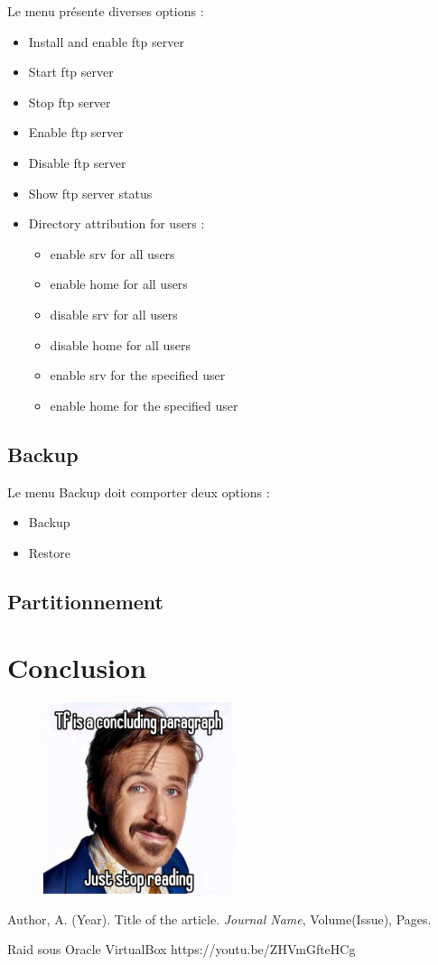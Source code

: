 \documentclass{article}
\begin{document}
	
	Le menu présente diverses options :
	\begin{itemize}
		\item Install and enable ftp server
		\item Start ftp server 
		\item Stop ftp server
		\item Enable ftp server
		\item Disable ftp server 
		\item Show ftp server status
		\item Directory attribution for users :
		\begin{itemize}
			\item enable srv for all users
			\item enable home for all users
			\item  disable srv for all users
			\item disable home for all users
			\item enable srv for the specified user
			\item enable home for the specified user
		\end{itemize}
	\end{itemize}
	
	\newpage
	
	\subsection{Backup}
	Le menu Backup doit comporter deux options :
	\begin{itemize}
		\item Backup
		\item Restore
	\end{itemize}
	
	\newpage
	
	\subsection{Partitionnement}
	
	\newpage
	\section{Conclusion}


	\begin{figure}[h]
		\centering
		\includegraphics[width=0.5\textwidth]{gosling.png}
		
		\label{fig:gosling}
	\end{figure}
	

	\begin{thebibliography}{9}
		Author, A. (Year). Title of the article. \textit{Journal Name}, Volume(Issue), Pages.
		
		Raid sous Oracle VirtualBox 
		https://youtu.be/ZHVmGfteHCg
	\end{thebibliography}
\end{document}
